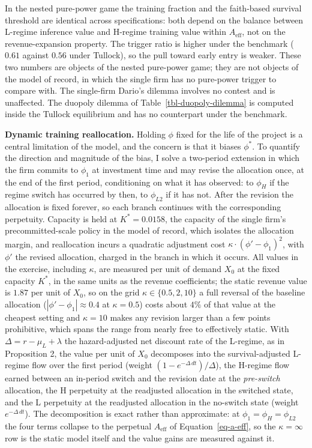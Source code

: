 \documentclass[
  11pt,
  letterpaper,
]{scrartcl}
\begin{document}
In the nested pure-power game the training fraction and the faith-based
survival threshold are identical across specifications: both depend on
the balance between L-regime inference value and H-regime training value
within \(A_{\text{eff}}\), not on the revenue-expansion property. The
trigger ratio is higher under the benchmark (\(0.61\) against \(0.56\)
under Tullock), so the pull toward early entry is weaker. These two
numbers are objects of the nested pure-power game; they are not objects
of the model of record, in which the single firm has no pure-power
trigger to compare with. The single-firm Dario's dilemma involves no
contest and is unaffected. The duopoly dilemma of
Table~\ref{tbl-duopoly-dilemma} is computed inside the Tullock
equilibrium and has no counterpart under the benchmark.

\textbf{Dynamic training reallocation.} Holding \(\phi\) fixed for the
life of the project is a central limitation of the model, and the
concern is that it biases \(\phi^*\). To quantify the direction and
magnitude of the bias, I solve a two-period extension in which the firm
commits to \(\phi_1\) at investment time and may revise the allocation
once, at the end of the first period, conditioning on what it has
observed: to \(\phi_H\) if the regime switch has occurred by then, to
\(\phi_{L2}\) if it has not. After the revision the allocation is fixed
forever, so each branch continues with the corresponding perpetuity.
Capacity is held at \(K^* = 0.0158\), the capacity of the single firm's
precommitted-scale policy in the model of record, which isolates the
allocation margin, and reallocation incurs a quadratic adjustment cost
\(\kappa \cdot (\phi' - \phi_1)^2\), with \(\phi'\) the revised
allocation, charged in the branch in which it occurs. All values in the
exercise, including \(\kappa\), are measured per unit of demand \(X_0\)
at the fixed capacity \(K^*\), in the same units as the revenue
coefficients; the static revenue value is \(1.87\) per unit of \(X_0\),
so on the grid \(\kappa \in \{0.5, 2, 10\}\) a full reversal of the
baseline allocation (\(|\phi' - \phi_1| \approx 0.4\) at
\(\kappa = 0.5\)) costs about \(4\%\) of that value at the cheapest
setting and \(\kappa = 10\) makes any revision larger than a few points
prohibitive, which spans the range from nearly free to effectively
static. With \(\Delta = r - \mu_L + \lambda\) the hazard-adjusted net
discount rate of the L-regime, as in Proposition 2, the value per unit
of \(X_0\) decomposes into the survival-adjusted L-regime flow over the
first period (weight \((1 - e^{-\Delta \, dt})/\Delta\)), the H-regime
flow earned between an in-period switch and the revision date at the
\emph{pre-switch} allocation, the H perpetuity at the readjusted
allocation in the switched state, and the L perpetuity at the readjusted
allocation in the no-switch state (weight \(e^{-\Delta \, dt}\)). The
decomposition is exact rather than approximate: at
\(\phi_1 = \phi_H = \phi_{L2}\) the four terms collapse to the perpetual
\(A_{\text{eff}}\) of Equation~\ref{eq-a-eff}, so the
\(\kappa = \infty\) row is the static model itself and the value gains
are measured against it.
\end{document}
